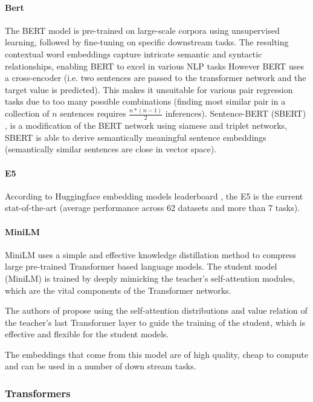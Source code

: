 \documentclass[a4paper,12pt]{article}
\begin{document}
\paragraph{Bert}
The BERT model \cite{bert} is pre-trained on large-scale corpora using unsupervised learning, followed by fine-tuning on specific downstream tasks. The resulting contextual word embeddings capture intricate semantic and syntactic relationships, enabling BERT to excel in various NLP tasks However BERT \cite{bert} uses a cross-encoder (i.e. two sentences are passed to the transformer network and the target value is predicted). This makes it unsuitable for various pair regression tasks due to too many possible combinations (finding most similar pair in a collection of $n$ sentences requires $\frac{n*(n-1)}{2}$ inferences). Sentence-BERT (SBERT) \cite{sbert}, is a modification of the BERT network using siamese and triplet networks, SBERT is able to
derive semantically meaningful sentence embeddings (semantically similar sentences are close in vector space).

\paragraph{E5}
According to Huggingface embedding models leaderboard \cite{embedding-leaderboard}, the E5 \cite{e5} is the current stat-of-the-art (average performance across 62 datasets and more than 7 tasks).

\paragraph{MiniLM}
MiniLM \cite{minilm} uses a simple and effective knowledge distillation method to compress large pre-trained Transformer based language models. The student model (MiniLM) is trained by deeply mimicking the teacher’s self-attention \cite{attention} modules,
which are the vital components of the Transformer networks.

The authors of \cite{minilm} propose using the self-attention distributions and value
relation of the teacher’s last Transformer layer to guide the
training of the student, which is effective and flexible for the student models. 

The embeddings that come from this model are of high quality, cheap to compute and can be used in a number of down stream tasks.

\subsubsection{Transformers}
\end{document}
